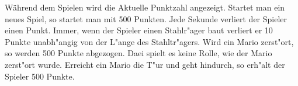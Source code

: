 Während dem Spielen wird die Aktuelle Punktzahl angezeigt.
Startet man ein neues Spiel, so startet man mit 500 Punkten.
Jede Sekunde verliert der Spieler einen Punkt.
Immer, wenn der Spieler einen Stahlr"ager baut verliert er 10 Punkte unabh"angig von der L"ange des Stahltr"agers.
Wird ein Mario zerst"ort, so werden 500 Punkte abgezogen. Daei spielt es keine Rolle, wie der Mario zerst"ort wurde.
Erreicht ein Mario die T"ur und geht hindurch, so erh"alt der Spieler 500 Punkte.